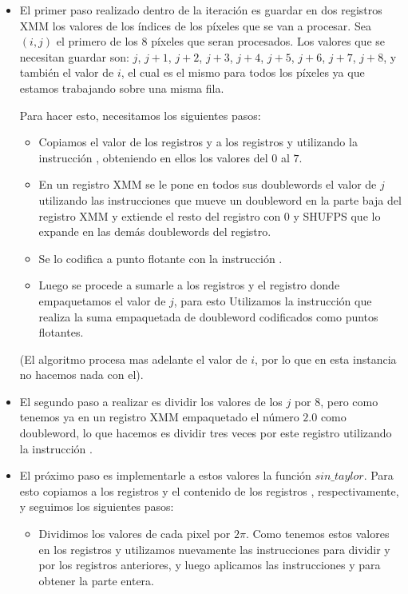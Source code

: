 \begin{itemize}
  \item El primer paso realizado dentro de la iteración es guardar en dos registros XMM los valores de los índices de los píxeles que se van a procesar. Sea $(i,j)$ el primero de los $8$ píxeles que seran procesados. Los valores que se necesitan guardar son: $j$, $j+1$, $j+2$, $j+3$, $j+4$, $j+5$, $j+6$, $j+7$, $j+8$, y también el valor de $i$, el cual es el mismo para todos los píxeles ya que estamos trabajando sobre una misma fila.
  
  Para hacer esto, necesitamos los siguientes pasos:
  \begin{itemize}
    \item Copiamos el valor de los registros  y  a los registros  y  utilizando la instrucción , obteniendo en ellos los valores del $0$ al $7$.
    \item En un registro XMM se le pone en todos sus doublewords el valor de $j$ utilizando las instrucciones  que mueve un doubleword en la parte baja del registro XMM y extiende el resto del registro con $0$ y SHUFPS que lo expande en las demás doublewords del registro. 
    \item Se lo codifica a punto flotante con la instrucción . 
    \item Luego se procede a sumarle a los registros  y  el registro donde empaquetamos el valor de $j$, para esto Utilizamos la instrucción  que realiza la suma empaquetada de doubleword codificados como puntos flotantes.
  \end{itemize}
  
  (El algoritmo procesa mas adelante el valor de $i$, por lo que en esta instancia no hacemos nada con el).

  \item El segundo paso a realizar es dividir los valores de los $j$ por $8$, pero como tenemos ya en un registro XMM empaquetado el número $2.0$ como doubleword, lo que hacemos es dividir tres veces por este registro utilizando la instrucción .

  \item  El próximo paso es implementarle a estos valores la función $sin\_taylor$. Para esto copiamos a los registros  y  el contenido de los registros , respectivamente, y seguimos los siguientes pasos:

  \begin{itemize}
    \item Dividimos los valores de cada pixel por $2\pi$. Como tenemos estos valores en los registros  y  utilizamos nuevamente las instrucciones  para dividir  y  por los registros anteriores, y luego aplicamos las instrucciones  y  para obtener la parte entera.


\end{itemize}
\end{itemize}
